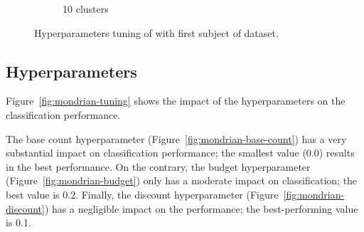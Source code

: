 \begin{figure}
\begin{subfigure}[b]{0.49\textwidth}
		 \caption{10 clusters}
	 \end{subfigure}
	\caption{Hyperparameters tuning of \mcnn with first subject of \banosdataset dataset.}
	\label{fig:mcnn-tuning-error}
\end{figure}

\subsection{\mondrianforest Hyperparameters}

Figure~\ref{fig:mondrian-tuning} shows the impact of the \mondrianforest hyperparameters on
the classification performance. 

The base count hyperparameter (Figure~\ref{fig:mondrian-base-count}) has a
very substantial impact on classification performance; the smallest value
(0.0) results in the best performance. On the contrary, the
budget hyperparameter (Figure~\ref{fig:mondrian-budget}) only has a
moderate impact on classification; the best value is 0.2. Finally, the discount hyperparameter
(Figure~\ref{fig:mondrian-discount}) has a negligible impact on the
performance; the best-performing value is 0.1.

